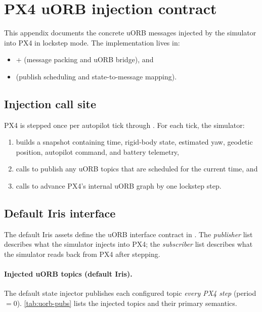 \section{PX4 uORB injection contract}
\label{app:uorb-injection}

This appendix documents the concrete uORB messages injected by the simulator into PX4 in lockstep mode. The implementation lives in:
\begin{itemize}[leftmargin=*,itemsep=2pt]
  \item {} +  (message packing and uORB bridge), and
  \item {} (publish scheduling and state-to-message mapping).
\end{itemize}

\subsection{Injection call site}

PX4 is stepped once per autopilot tick through . For each tick, the simulator:
\begin{enumerate}[leftmargin=*,itemsep=2pt]
  \item builds a  snapshot containing time, rigid-body state, estimated yaw, geodetic position, autopilot command, and battery telemetry,
  \item calls  to publish any uORB topics that are scheduled for the current time, and
  \item calls  to advance PX4's internal uORB graph by one lockstep step.
\end{enumerate}

\subsection{Default Iris interface}

The default Iris assets define the uORB interface contract in . The \emph{publisher} list describes what the simulator injects into PX4; the \emph{subscriber} list describes what the simulator reads back from PX4 after stepping.

\paragraph{Injected uORB topics (default Iris).}
The default state injector publishes each configured topic \emph{every PX4 step} (period $=0$). \cref{tab:uorb-pubs} lists the injected topics and their primary semantics.

